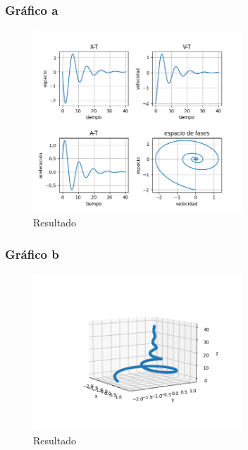 \documentclass{article}
\begin{document}
\subsubsection{Gráfico a}
\begin{figure}[H]
    \centering
    \includegraphics[width=0.7\textwidth]{Figure_2_1.png}
    \caption{Resultado}
\end{figure}

\subsubsection{Gráfico b}
\begin{figure}[H]
    \centering
    \includegraphics[width=0.7\textwidth]{Figure_2_2.png}
    \caption{Resultado}
\end{figure}
\end{document}
